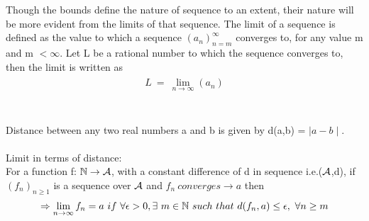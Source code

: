 \documentclass[a4paper]{article}
\begin{document}
Though the bounds define the nature of sequence to an extent, their nature will be more evident from the limits of that sequence. The limit of a sequence is defined as the value to which a sequence $(a_n)^{\infty}_{n=m}$  converges to, for any value m and m $< \infty$. Let L be a rational number to which the sequence converges to, then the limit is written as\\
\begin{align}
\begin{split}
L \ = \ \lim_{n \to \infty} (a_n)
\end{split}
\end{align}
\\
\\
Distance between any two real numbers a and b is given by d(a,b) = $\mid a-b \mid$.\\
\\
Limit in terms of distance:
\\
For a function f: $\mathbb N \to \mathcal A$, with a constant difference of d in sequence i.e.($\mathcal A$,d), if $(f_n)_{n\geq1}$ is a sequence over $\mathcal A$ and $f_n \ converges \to a$ then\\
\begin{align}
\begin{split}
\Rightarrow \lim_{n \to \infty} f_n = a\ if\ \forall \epsilon > 0, \exists\ m\in \mathbb N\ such\ that\ d(f_n, a) \leq \epsilon,\ \forall n\geq m
\end{split}
\end{align}
\end{document}
